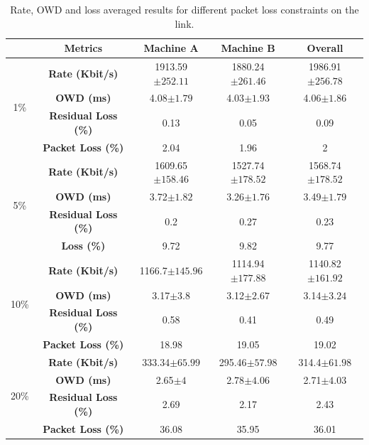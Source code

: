 \begin{table}[h]
\begin{center}
\begin{tabular}{ |c|c|c|c|c| }
\hline
 & Metrics & Machine A & Machine B & Overall\\ \hline
\multirow{4}{*}{1\%} & \textbf{Rate (Kbit/s)} & 1913.59$\pm252.11$ & 1880.24$\pm261.46$ & 1986.91$\pm256.78$\\ \cline{2-5}
 & \textbf{OWD (ms)} & 4.08$\pm1.79$ & 4.03$\pm1.93$ & 4.06$\pm1.86$ \\ \cline{2-5}
 & \textbf{Residual Loss (\%)} & 0.13 & 0.05 & 0.09 \\ \cline{2-5}
 & \textbf{Packet Loss (\%)} & 2.04 & 1.96 & 2 \\ \hline
\multirow{4}{*}{5\%} & \textbf{Rate (Kbit/s)} & 1609.65$\pm158.46$ & 1527.74$\pm178.52$ & 1568.74$\pm178.52$\\ \cline{2-5}
 & \textbf{OWD (ms)} & 3.72$\pm1.82$ & 3.26$\pm1.76$ & 3.49$\pm1.79$ \\ \cline{2-5}
 & \textbf{Residual Loss (\%)} & 0.2 & 0.27 & 0.23 \\ \cline{2-5}
 & \textbf{Loss (\%)} & 9.72 & 9.82 & 9.77 \\ \hline
\multirow{4}{*}{10\%} & \textbf{Rate (Kbit/s)} & 1166.7$\pm145.96$ & 1114.94$\pm177.88$ & 1140.82$\pm161.92$\\ \cline{2-5}
 & \textbf{OWD (ms)} & 3.17$\pm3.8$ & 3.12$\pm2.67$ & 3.14$\pm3.24$ \\ \cline{2-5}
 & \textbf{Residual Loss (\%)} & 0.58 & 0.41 & 0.49 \\ \cline{2-5}
 & \textbf{Packet Loss (\%)} & 18.98 & 19.05 & 19.02 \\ \hline
\multirow{4}{*}{20\%} & \textbf{Rate (Kbit/s)} & 333.34$\pm65.99$ & 295.46$\pm57.98$ & 314.4$\pm61.98$\\ \cline{2-5}
 & \textbf{OWD (ms)} & 2.65$\pm4$ & 2.78$\pm4.06$ & 2.71$\pm4.03$ \\ \cline{2-5}
 & \textbf{Residual Loss (\%)} & 2.69 & 2.17 & 2.43 \\ \cline{2-5}
 & \textbf{Packet Loss (\%)} & 36.08 & 35.95 & 36.01 \\ \hline
\end{tabular}
\caption[Rate, OWD and loss averaged results for different packet loss constraints on the link]{Rate, OWD and loss averaged results for different packet loss constraints on the link.}
\label{fig:p2p_packet_bw}
\end{center}
\end{table}

